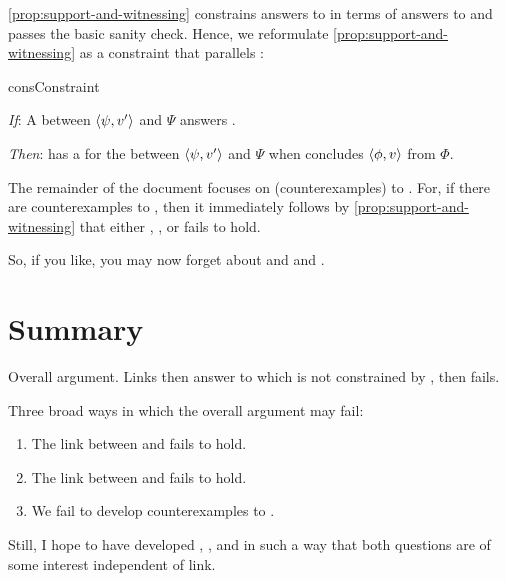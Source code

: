 \begin{note}
  \autoref{prop:support-and-witnessing} constrains answers to \qWhyV{} in terms of answers to \qHowV{} and passes the basic sanity check.
  Hence, we reformulate \autoref{prop:support-and-witnessing} as a constraint that parallels \issueInclusion{}:

  \begin{constraint}{consConstraint}{\issueConstraint{}}
    \vspace{-\baselineskip}
    \begin{itenum}
    \item[\emph{If}:]
      A \ros{} between \(\langle \psi, v' \rangle\) and \(\Psi\) answers \qWhyV{}.
    \item[\emph{Then}:]
      \vAgent{} has a \wit{} for the \ros{} between \(\langle \psi, v' \rangle\) and \(\Psi\) when \vAgent{} concludes \(\langle \phi, v \rangle\) from \(\Phi\).
    \end{itenum}
    \vspace{-\baselineskip}
  \end{constraint}

  \noindent%
  The remainder of the document focuses on (counterexamples) to \issueConstraint{}.
  For, if there are counterexamples to \issueConstraint{}, then it immediately follows by \autoref{prop:support-and-witnessing} that either \linkW{}, \linkH{}, or \issueInclusion{} fails to hold.

  So, if you like, you may now forget about \qWhy{} and \qHow{} and \issueInclusion{}.
\end{note}



\section*{Summary}

\begin{note}
  Overall argument.
  Links then answer to \qWhyV{} which is not constrained by \qHowV{}, then \issueInclusion{} fails.

  Three broad ways in which the overall argument may fail:
  \begin{enumerate}[label=\arabic*., ref=(\arabic*)]
  \item
    The link between \qWhyV{} and \qWhy{} fails to hold.
  \item
    The link between \qHowV{} and \qHow{} fails to hold.
  \item
    We fail to develop counterexamples to \issueConstraint{}.
  \end{enumerate}

  Still, I hope to have developed \qWhyV{}, \qHowV{}, and \issueConstraint{} in such a way that both questions are of some interest independent of link.
\end{note}



